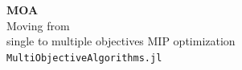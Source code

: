 \documentclass[]{beamer}
\begin{document}

\begin{frame}

\begin{center} 
{\Large \textbf{\Huge{MOA} \vspace{5mm}} \\ Moving from \\ single to multiple objectives MIP optimization \vspace{5mm}\\ \texttt{MultiObjectiveAlgorithms.jl} \\}
\end{center}




      
\end{frame}
\end{document}
